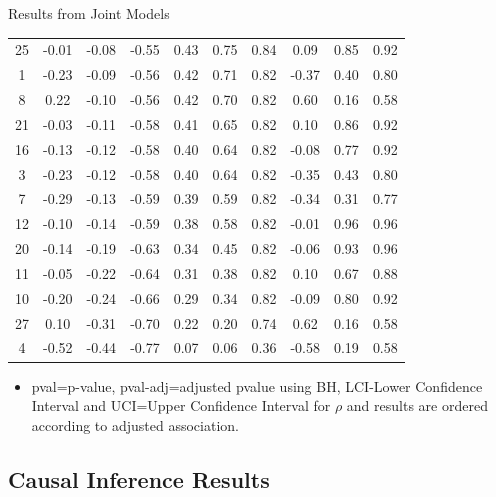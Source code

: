 \documentclass[a4paper,9pt]{beamer}\usepackage[]{graphicx}\usepackage[]{color}
\begin{document}
\begin{frame}{Results from Joint Models}
\begin{table}[ht]
\begin{tabular}{cccccccccc}
  25 & -0.01 & -0.08 & -0.55 & 0.43 & 0.75 & 0.84 & 0.09 & 0.85 & 0.92 \\ 
  1 & -0.23 & -0.09 & -0.56 & 0.42 & 0.71 & 0.82 & -0.37 & 0.40 & 0.80 \\ 
  8 & 0.22 & -0.10 & -0.56 & 0.42 & 0.70 & 0.82 & 0.60 & 0.16 & 0.58 \\ 
  21 & -0.03 & -0.11 & -0.58 & 0.41 & 0.65 & 0.82 & 0.10 & 0.86 & 0.92 \\ 
  16 & -0.13 & -0.12 & -0.58 & 0.40 & 0.64 & 0.82 & -0.08 & 0.77 & 0.92 \\ 
  3 & -0.23 & -0.12 & -0.58 & 0.40 & 0.64 & 0.82 & -0.35 & 0.43 & 0.80 \\ 
  7 & -0.29 & -0.13 & -0.59 & 0.39 & 0.59 & 0.82 & -0.34 & 0.31 & 0.77 \\ 
  12 & -0.10 & -0.14 & -0.59 & 0.38 & 0.58 & 0.82 & -0.01 & 0.96 & 0.96 \\ 
  20 & -0.14 & -0.19 & -0.63 & 0.34 & 0.45 & 0.82 & -0.06 & 0.93 & 0.96 \\ 
  11 & -0.05 & -0.22 & -0.64 & 0.31 & 0.38 & 0.82 & 0.10 & 0.67 & 0.88 \\ 
  10 & -0.20 & -0.24 & -0.66 & 0.29 & 0.34 & 0.82 & -0.09 & 0.80 & 0.92 \\ 
  27 & 0.10 & -0.31 & -0.70 & 0.22 & 0.20 & 0.74 & 0.62 & 0.16 & 0.58 \\ 
  4 & -0.52 & -0.44 & -0.77 & 0.07 & 0.06 & 0.36 & -0.58 & 0.19 & 0.58 \\ 
   \hline
\end{tabular}
\end{table}

\begin{itemize}
\item pval=p-value, pval-adj=adjusted pvalue using BH, LCI-Lower Confidence Interval and UCI=Upper Confidence Interval for $\rho$ and results are ordered according to adjusted association.
\end{itemize}
\end{frame}

\subsection{Causal Inference Results}
\end{document}
